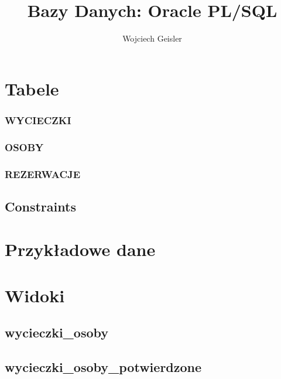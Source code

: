 \documentclass[12pt]{article}
\begin{document}
\title{Bazy Danych: Oracle PL/SQL}
\author{Wojciech Geisler}
\date{}
\maketitle

\tableofcontents

\clearpage

\section{Tabele}

\subsubsection{WYCIECZKI}


\subsubsection{OSOBY}


\subsubsection{REZERWACJE}


\subsection{Constraints}


\section{Przykładowe dane}


\section{Widoki}


\subsection{wycieczki\_osoby}


\subsection{wycieczki\_osoby\_potwierdzone}

\end{document}
